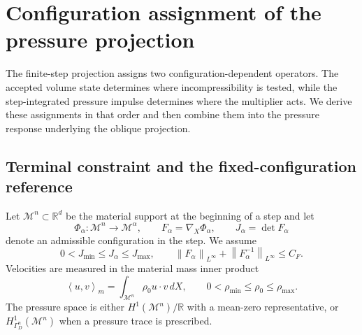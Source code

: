 \documentclass[11pt]{article}
\theoremstyle{plain}
\theoremstyle{definition}
\theoremstyle{remark}
\newcommand{\R}{\mathbb{R}}
\newcommand{\M}{\mathcal{M}}
\newcommand{\norm}[2][]{\left\lVert #2\right\rVert_{#1}}
\newcommand{\ip}[3][]{\left\langle #2,#3\right\rangle_{#1}}
\begin{document}
\section{Configuration assignment of the pressure projection}
\label{sec:configuration_assignment}

The finite-step projection assigns two configuration-dependent operators.  The
accepted volume state determines where incompressibility is tested, while the
step-integrated pressure impulse determines where the multiplier acts.  We
derive these assignments in that order and then combine them into the pressure
response underlying the oblique projection.

\subsection{Terminal constraint and the fixed-configuration reference}

Let $\M^n\subset\R^d$ be the material support at the beginning of a step and
let
\begin{equation}
  \Phi_\alpha:\M^n\rightarrow\M^\alpha,
  \qquad F_\alpha=\nabla_X\Phi_\alpha,
  \qquad J_\alpha=\det F_\alpha
  \label{eq:material_maps}
\end{equation}
denote an admissible configuration in the step.  We assume
\begin{equation}
  0<J_{\min}\le J_\alpha\le J_{\max},
  \qquad
  \norm[L^\infty]{F_\alpha}+\norm[L^\infty]{F_\alpha^{-1}}
  \le C_F.
  \label{eq:admissible_geometry}
\end{equation}
Velocities are measured in the material mass inner product
\begin{equation}
  \ip[m]{u}{v}=\int_{\M^n}\rho_0 u\cdot v\,dX,
  \qquad 0<\rho_{\min}\le\rho_0\le\rho_{\max}.
  \label{eq:material_mass_inner_product}
\end{equation}
The pressure space is either $H^1(\M^n)/\R$ with a mean-zero representative,
or $H^1_{\Gamma_D^n}(\M^n)$ when a pressure trace is prescribed.
\end{document}

